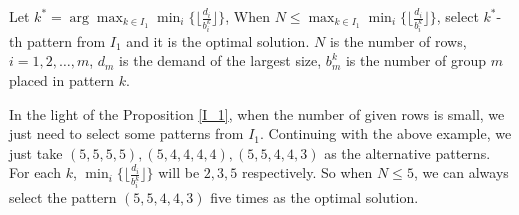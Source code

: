 \begin{prop}\label{I_1}
  Let $k^{*} = \arg \max_{k\in I_1} \min_{i} \{\lfloor \frac{d_i}{b_i^k}\rfloor\}$, 
  When $N \leq \max_{k\in I_1} \min_{i} \{\lfloor \frac{d_i}{b_i^k}\rfloor\}$, select $k^*$-th pattern from $I_1$ and it is the optimal solution.
  $N$ is the number of rows, $i = 1,2,\ldots, m$, $d_m$ is the demand of the largest size, $b_m^k$ is the number of group $m$ placed in pattern $k$.
\end{prop}

In the light of the Proposition \ref{I_1}, when the number of given rows is small, we just need to select some patterns from $I_1$.
Continuing with the above example, we just take $(5,5,5,5), (5,4,4,4,4), (5,5,4,4,3)$ as the alternative patterns. For each $k$, $\min_{i} \{\lfloor \frac{d_i}{b_i^k}\rfloor\}$ will be $2,3,5$ respectively. So when $N \leq 5$, we can always select the pattern $(5,5,4,4,3)$ five times as the optimal solution.




